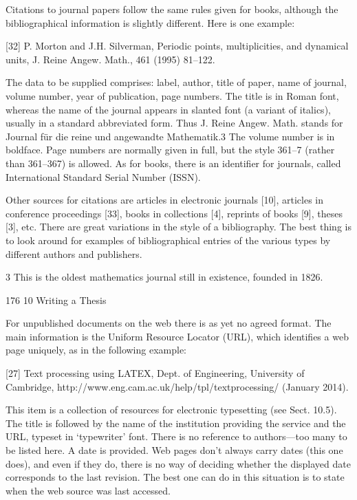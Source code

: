 \documentclass[11pt]{article}
\theoremstyle{plain}
\theoremstyle{definition}
\begin{document}
Citations to journal papers follow the same rules given for books, although the bibliographical information is slightly different. Here is one example:

[32] P. Morton and J.H. Silverman, Periodic points, multiplicities, and dynamical units, J. Reine Angew. Math., 461 (1995) 81--122.

The data to be supplied comprises: label, author, title of paper, name of journal, volume number, year of publication, page numbers. The title is in Roman font, whereas the name of the journal appears in slanted font (a variant of italics), usually in a standard abbreviated form. Thus J. Reine Angew. Math. stands for Journal für die reine und angewandte Mathematik.3 The volume number is in boldface. Page numbers are normally given in full, but the style 361--7 (rather than 361--367) is allowed. As for books, there is an identifier for journals, called International Standard Serial Number (ISSN).

Other sources for citations are articles in electronic journals [10], articles in conference proceedings [33], books in collections [4], reprints of books [9], theses [3], etc. There are great variations in the style of a bibliography. The best thing is to look around for examples of bibliographical entries of the various types by different authors and publishers.

3 This is the oldest mathematics journal still in existence, founded in 1826.

176 10 Writing a Thesis

For unpublished documents on the web there is as yet no agreed format. The main information is the Uniform Resource Locator (URL), which identifies a web page uniquely, as in the following example:

[27] Text processing using LATEX, Dept. of Engineering, University of Cambridge, http://www.eng.cam.ac.uk/help/tpl/textprocessing/ (January 2014).

This item is a collection of resources for electronic typesetting (see Sect. 10.5). The title is followed by the name of the institution providing the service and the URL, typeset in `typewriter' font. There is no reference to authors---too many to be listed here. A date is provided. Web pages don't always carry dates (this one does), and even if they do, there is no way of deciding whether the displayed date corresponds to the last revision. The best one can do in this situation is to state when the web source was last accessed.
\end{document}
